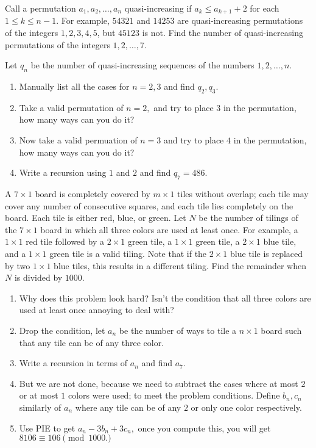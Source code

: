 \documentclass[mast]{lucky}
\begin{document}
\begin{exam}[AIME 2015 II/10]
Call a permutation $a_1,a_2,\ldots,a_n$ quasi-increasing if $a_k\le a_{k+1}+2$ for each $1\le k\le n-1$. For example, $54321$ and $14253$ are quasi-increasing permutations of the integers $1,2,3,4,5$, but $45123$ is not. Find the number of quasi-increasing permutations of the integers $1,2,\ldots,7$.
\end{exam}


\begin{walk}
Let $q_n$ be the number of quasi-increasing sequences of the numbers $1, 2, \ldots, n.$

\begin{enumerate}
\item Manually list all the cases for $n=2, 3$ and find $q_2, q_3$.
\item Take a valid permutation of $n = 2,$ and try to place $3$ in the permutation, how many ways can you do it?
\item Now take  a valid permuation of $n= 3$ and try to place $4$ in the permutation, how many ways can you do it?
\item  Write a recursion using $1$ and $2$ and find $q_7=486.$
\end{enumerate}
\end{walk}


\begin{exam}[AIME 2013 II/9]
A $7 \times 1$ board is completely covered by $m \times 1$ tiles without overlap; each tile may cover any number of consecutive squares, and each tile lies completely on the board. Each tile is either red, blue, or green. Let $N$ be the number of tilings of the $7 \times 1$ board in which all three colors are used at least once. For example, a $1 \times 1$ red tile followed by a $2 \times 1$ green tile, a $1 \times 1$ green tile, a $2 \times 1$ blue tile, and a $1 \times 1$ green tile is a valid tiling. Note that if the $2 \times 1$ blue tile is replaced by two $1 \times 1$ blue tiles, this results in a different tiling. Find the remainder when $N$ is divided by $1000$.
\end{exam}


\begin{walk}
\begin{enumerate}
\item Why does this problem look hard? Isn't the condition that all three colors are used at least once annoying to deal with?
\item Drop the condition, let $a_n$ be the number of ways to tile a $n \times 1$ board such that any tile can be of any three color.
\item Write a recursion in terms of $a_n$ and find $a_7.$
\item But we are not done, because we need to subtract the cases where at most $2$ or at most $1$ colors were used; to meet the problem conditions.
Define $b_n, c_n$ similarly of $a_n$ where any tile can be of any $2$ or only one color respectively. 
\item Use PIE to get $a_n - 3b_n + 3c_n,$ once you compute this, you will get $8106 \equiv 106 \pmod{1000.}$
\end{enumerate}
\end{walk}
\end{document}
